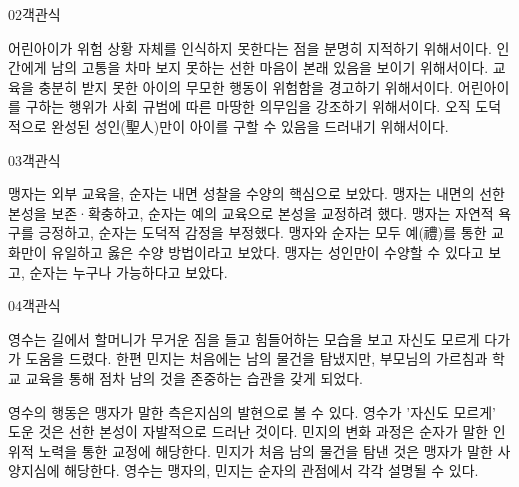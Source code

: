 \documentclass[fs85,seriesWit]{korfarm-base}
\begin{document}
\begin{kfQBlock}{02}{객관식}
\begin{kfChoices}
\kfChoice 어린아이가 위험 상황 자체를 인식하지 못한다는 점을 분명히 지적하기 위해서이다.
\kfChoice 인간에게 남의 고통을 차마 보지 못하는 선한 마음이 본래 있음을 보이기 위해서이다.
\kfChoice 교육을 충분히 받지 못한 아이의 무모한 행동이 위험함을 경고하기 위해서이다.
\kfChoice 어린아이를 구하는 행위가 사회 규범에 따른 마땅한 의무임을 강조하기 위해서이다.
\kfChoice 오직 도덕적으로 완성된 성인(聖人)만이 아이를 구할 수 있음을 드러내기 위해서이다.
\end{kfChoices}
\end{kfQBlock}

\begin{kfQBlock}{03}{객관식}
\begin{kfChoices}
\kfChoice 맹자는 외부 교육을, 순자는 내면 성찰을 수양의 핵심으로 보았다.
\kfChoice 맹자는 내면의 선한 본성을 보존·확충하고, 순자는 예의 교육으로 본성을 교정하려 했다.
\kfChoice 맹자는 자연적 욕구를 긍정하고, 순자는 도덕적 감정을 부정했다.
\kfChoice 맹자와 순자는 모두 예(禮)를 통한 교화만이 유일하고 옳은 수양 방법이라고 보았다.
\kfChoice 맹자는 성인만이 수양할 수 있다고 보고, 순자는 누구나 가능하다고 보았다.
\end{kfChoices}
\end{kfQBlock}

\begin{kfQBlock}{04}{객관식}
\begin{kfEvidence}영수는 길에서 할머니가 무거운 짐을 들고 힘들어하는 모습을 보고 자신도 모르게 다가가 도움을 드렸다. 한편 민지는 처음에는 남의 물건을 탐냈지만, 부모님의 가르침과 학교 교육을 통해 점차 남의 것을 존중하는 습관을 갖게 되었다.\end{kfEvidence}
\begin{kfChoices}
\kfChoice 영수의 행동은 맹자가 말한 측은지심의 발현으로 볼 수 있다.
\kfChoice 영수가 '자신도 모르게' 도운 것은 선한 본성이 자발적으로 드러난 것이다.
\kfChoice 민지의 변화 과정은 순자가 말한 인위적 노력을 통한 교정에 해당한다.
\kfChoice 민지가 처음 남의 물건을 탐낸 것은 맹자가 말한 사양지심에 해당한다.
\kfChoice 영수는 맹자의, 민지는 순자의 관점에서 각각 설명될 수 있다.
\end{kfChoices}
\end{kfQBlock}
\end{document}

